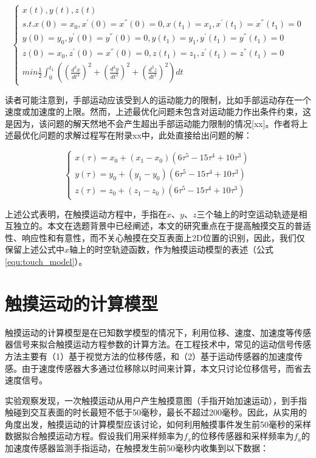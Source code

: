 \begin{equation}
	\begin{cases}
		x(t),y(t),z(t) \\
		s.t. x(0)=x_0,x^{'}(0)=x^{''}(0)=0,x(t_1)=x_1,x^{'}(t_1)=x^{''}(t_1)=0 \\
		y(0)=y_0,y^{'}(0)=y^{''}(0)=0,y(t_1)=y_1,y^{'}(t_1)=y^{''}(t_1)=0 \\
		z(0)=x_0,z^{'}(0)=x^{''}(0)=0,z(t_1)=z_1,z^{'}(t_1)=z^{''}(t_1)=0 \\
		min\frac{1}{2}\int_{0}^{t_1}\left(\left(\frac{d^3x}{dt^3}\right)^2+\left(\frac{d^3y}{dt^3}\right)^2+\left(\frac{d^3z}{dt^3}\right)^2\right)dt
	\end{cases}
\end{equation}

读者可能注意到，手部运动应该受到人的运动能力的限制，比如手部运动存在一个速度或加速度的上限。然而，上述最优化问题未包含对运动能力作出条件约束，这是因为，该问题的解天然地不会产生超出手部运动能力限制的情况[xx]。作者将上述最优化问题的求解过程写在附录xx中，此处直接给出问题的解：

\begin{equation}
	\begin{cases}
		x(\tau)=x_0+(x_1-x_0)(6\tau^5-15\tau^4+10\tau^3) \\
		y(\tau)=y_0+(y_1-y_0)(6\tau^5-15\tau^4+10\tau^3) \\
		z(\tau)=z_0+(z_1-z_0)(6\tau^5-15\tau^4+10\tau^3)
	\end{cases}
\end{equation}

上述公式表明，在触摸运动方程中，手指在$x$、$y$、$z$三个轴上的时空运动轨迹是相互独立的。本文在选题背景中已经阐述，本文的研究重点在于提高触摸交互的普适性、响应性和有意性，而不关心触摸在交互表面上2D位置的识别，因此，我们仅保留上述公式中$x$轴上的时空轨迹函数，作为触摸运动模型的表述（公式\ref{equ:touch_model}）。

\section{触摸运动的计算模型}

触摸运动的计算模型是在已知数学模型的情况下，利用位移、速度、加速度等传感器信号来拟合触摸运动方程参数的计算方法。在工程技术中，常见的运动信号传感方法主要有（1）基于视觉方法的位移传感，和（2）基于运动传感器的加速度传感。由于速度传感器大多通过位移除以时间来计算，本文只讨论位移信号，而省去速度信号。

实验观察发现，一次触摸运动从用户产生触摸意图（手指开始加速运动），到手指触碰到交互表面的时长最短不低于50毫秒，最长不超过200毫秒。因此，从实用的角度出发，触摸运动的计算模型应该讨论，如何利用触摸事件发生前50毫秒的采样数据拟合触摸运动方程。假设我们用采样频率为$f_x$的位移传感器和采样频率为$f_a$的加速度传感器监测手指运动，在触摸发生前50毫秒内收集到以下数据：

